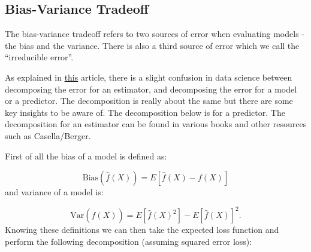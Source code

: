 \subsection{Bias-Variance Tradeoff}

The bias-variance tradeoff refers to two sources of error when evaluating models - the bias and the variance. There is also a third source of error which we call the ``irreducible error''. 

As explained in \href{https://towardsdatascience.com/mse-and-bias-variance-decomposition-77449dd2ff55}{this} article, there is a slight confusion in data science between decomposing the error for an \gls{estimator}, and decomposing the error for a model or a predictor. The decomposition is really about the same but there are some key insights to be aware of. The decomposition below is for a predictor. The decomposition for an estimator can be found in various books and other resources such as Casella/Berger. 

First of all the bias of a model is defined as:

\begin{equation}
\text{Bias}\left(\hat{f}(X)\right) = E \left[\hat{f}(X) - f(X)\right]
\end{equation}
and variance of a model is:

\begin{equation}
\text{Var}\left(\hat{f}(X)\right) = E \left[\hat{f}(X)^2\right] - E \left[\hat{f}(X)\right]^2. 
\end{equation}
Knowing these definitions we can then take the expected loss function and perform the following decomposition (assuming squared error loss):

